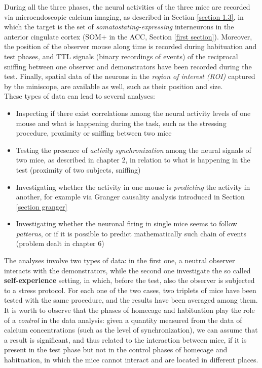 \documentclass[12pt, a4paper]{report}
\begin{document}
During all the three phases, the neural activities of the three mice are recorded via microendoscopic calcium imaging, as described in Section \ref{section 1.3}, in which the target is the set of \textit{somatostating-expressing} interneurons in the anterior cingulate cortex (SOM+ in the ACC, Section \ref{first section}). Moreover, the position of the observer mouse along time is recorded during habituation and test phases, and TTL signals (binary recordings of events) of the reciprocal sniffing between one observer and  demonstrators have been recorded during the test. Finally, spatial data of the neurons in the \textit{region of interest (ROI)} captured by the miniscope, are available as well, such as their position and size.\\
These types of data can lead to several analyses:
\begin{itemize}
	
	\item Inspecting if there exist correlations among the neural activity levels of one mouse and what is happening during the task, such as the stressing procedure, proximity or sniffing between two mice
	
	\item Testing the presence of \textit{activity synchronization} among the neural signals of two mice, as described in chapter 2, in relation to what is happening in the test (proximity of two subjects, sniffing)
	
	\item Investigating whether the activity in one mouse is \textit{predicting} the activity in another, for example via  Granger causality analysis introduced in Section \ref{section granger}
	
	\item Investigating whether the neuronal firing in single mice seems to follow \textit{patterns}, or if it is possible to predict mathematically such chain of events (problem dealt in chapter 6)
\end{itemize}


The analyses involve two types of data: in the first one, a neutral observer interacts with the demonstrators, while the second one investigate the so called \textbf{self-experience} setting, in which, before the test, also the observer is subjected to a stress protocol. For each one of the two cases, two triplets of mice have been tested with the same procedure, and the results have been averaged among them.\\
It is worth to observe that the phases of homecage and habituation play the role of a \textit{control} in the data analysis: given a quantity measured from the data of calcium concentrations (such as the level of synchronization), we can assume that a result is significant, and thus related to the interaction between mice, if it is present in the test phase but not in the control phases of homecage and habituation, in which the mice cannot interact and are located in different places.
\end{document}
